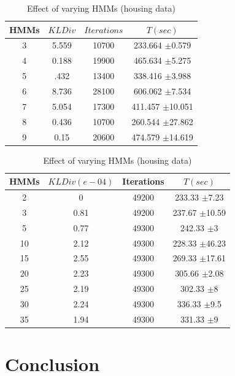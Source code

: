 \documentclass[runningheads,a4paper]{llncs}
\begin{document}
\begin{table}[htdp]
\parbox{.45\linewidth}{
\centering
\begin{tabular}{| c | c | c | c |}
\hline
HMMs & $KL Div$ & $Iterations$ & $T(sec)$  \\
\hline
3 & 5.559  & 10700 & 233.664 $\pm$0.579 \\
4 & 0.188 & 19900 & 465.634 $\pm$5.275  \\
5 & .432  & 13400 & 338.416 $\pm$3.988  \\
6 & 8.736  & 28100 & 606.062 $\pm$7.534 \\
7 & 5.054  & 17300 & 411.457 $\pm$10.051\\
8 & 0.436 & 10700 & 260.544 $\pm$27.862 \\
9 & 0.15 & 20600 & 474.579 $\pm$14.619 \\
\hline
\end{tabular}
\caption{Effect of varying HMMs (REDD)}
\label{table:hmm1}}
\hfill
\parbox{.45\linewidth}{
\centering
\begin{tabular}{| c | c | c | c |}
\hline
HMMs & $KL Div (e-04)$ & Iterations & $T(sec)$\\
\hline
2 & 0 & 49200 & 233.33 $\pm$7.23 \\
3 & 0.81 & 49200 & 237.67 $\pm$10.59 \\
5 & 0.77 & 49300 & 242.33 $\pm$3 \\
10 & 2.12 & 49300 & 228.33 $\pm$46.23 \\
15 & 2.55 & 49300 & 269.33 $\pm$17.61 \\
20 & 2.23 & 49300 & 305.66 $\pm$2.08  \\
25 & 2.19 & 49300 & 302.33 $\pm$8 \\
30 & 2.24 & 49300 & 336.33 $\pm$9.5 \\
35 & 1.94 & 49300 & 331.33 $\pm$9 \\
\hline
\end{tabular}
\caption{Effect of varying HMMs (housing data)}
\label{table:hmm2}
}
\end{table}







\section{Conclusion}
\label{conclusion}
\end{document}
